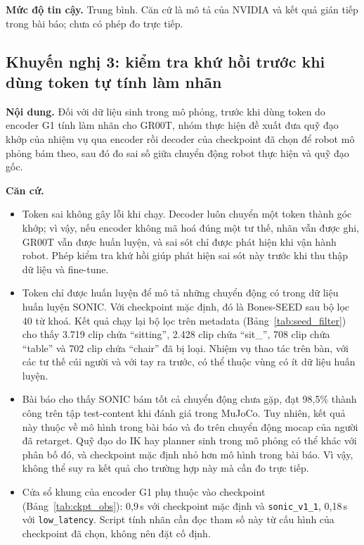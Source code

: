 \documentclass[12pt,a4paper,oneside]{report}
\newcommand{\code}[1]{\texttt{#1}}
\begin{document}
\textbf{Mức độ tin cậy.} Trung bình. Căn cứ là mô tả của NVIDIA và kết quả gián tiếp trong bài báo; chưa có phép đo trực tiếp.

\subsection{Khuyến nghị 3: kiểm tra khứ hồi trước khi dùng token tự tính làm nhãn}
\label{sec:rec_roundtrip}

\textbf{Nội dung.} Đối với dữ liệu sinh trong mô phỏng, trước khi dùng token do encoder G1 tính làm nhãn cho GR00T, nhóm thực hiện đề xuất đưa quỹ đạo khớp của nhiệm vụ qua encoder rồi decoder của checkpoint đã chọn để robot mô phỏng bám theo, sau đó đo sai số giữa chuyển động robot thực hiện và quỹ đạo gốc.

\textbf{Căn cứ.}
\begin{itemize}
\item Token sai không gây lỗi khi chạy. Decoder luôn chuyển một token thành góc khớp; vì vậy, nếu encoder không mã hoá đúng một tư thế, nhãn vẫn được ghi, GR00T vẫn được huấn luyện, và sai sót chỉ được phát hiện khi vận hành robot. Phép kiểm tra khứ hồi giúp phát hiện sai sót này trước khi thu thập dữ liệu và fine-tune.
\item Token chỉ được huấn luyện để mô tả những chuyển động có trong dữ liệu huấn luyện SONIC. Với checkpoint mặc định, đó là Bones-SEED sau bộ lọc 40 từ khoá. Kết quả chạy lại bộ lọc trên metadata (Bảng~\ref{tab:seed_filter}) cho thấy 3.719 clip chứa ``sitting'', 2.428 clip chứa ``sit\_'', 708 clip chứa ``table'' và 702 clip chứa ``chair'' đã bị loại. Nhiệm vụ thao tác trên bàn, với các tư thế cúi người và với tay ra trước, có thể thuộc vùng có ít dữ liệu huấn luyện.
\item Bài báo cho thấy SONIC bám tốt cả chuyển động chưa gặp, đạt 98,5\% thành công trên tập test-content khi đánh giá trong MuJoCo. Tuy nhiên, kết quả này thuộc về mô hình trong bài báo và đo trên chuyển động mocap của người đã retarget. Quỹ đạo do IK hay planner sinh trong mô phỏng có thể khác với phân bố đó, và checkpoint mặc định nhỏ hơn mô hình trong bài báo. Vì vậy, không thể suy ra kết quả cho trường hợp này mà cần đo trực tiếp.
\item Cửa sổ khung của encoder G1 phụ thuộc vào checkpoint (Bảng~\ref{tab:ckpt_obs}): 0,9\,s với checkpoint mặc định và \code{sonic\_v1\_1}, 0,18\,s với \code{low\_latency}. Script tính nhãn cần đọc tham số này từ cấu hình của checkpoint đã chọn, không nên đặt cố định.
\end{itemize}
\end{document}
